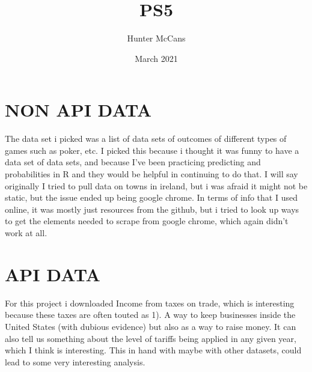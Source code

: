 \documentclass{article}
\title{PS5}
\author{Hunter McCans}
\date{March 2021}
\begin{document}
\maketitle

\section{NON API DATA}
The data set i picked was a list of data sets of outcomes of different types of games such as poker, etc. I picked this because i thought it was funny to have a data set of data sets, and because I've been practicing predicting and probabilities in R and they would be helpful in continuing to do that. I will say originally I tried to pull data on towns in ireland, but i was afraid it might not be static, but the issue ended up being google chrome. In terms of info that I used online, it was mostly just resources from the github, but i tried to look up ways to get the elements needed to scrape from google chrome, which again didn't work at all.

\section{API DATA}

For this project i downloaded Income from taxes on trade, which is interesting because these taxes are often touted as 1). A way to keep businesses inside the United States (with dubious evidence) but also as a way to raise money. It can also tell us something about the level of tariffs being applied in any given year, which I think is interesting. This in hand with maybe with other datasets, could lead to some very interesting analysis.
\end{document}

